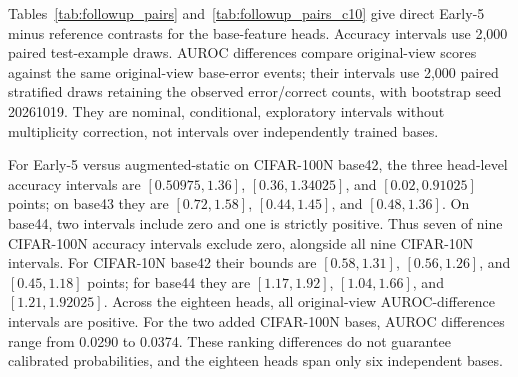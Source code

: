 \begin{table}[!ht]
\centering\small
\caption{Follow-up accuracy (\%); mean $\pm$ sample SD over three heads on each base. Each method retains its own noisy-validation-selected policy.}
\label{tab:followup_accuracy}

\end{table}

Tables~\ref{tab:followup_pairs} and~\ref{tab:followup_pairs_c10} give direct Early-5 minus reference contrasts for the base-feature heads. Accuracy intervals use 2,000 paired test-example draws. AUROC differences compare original-view scores against the same original-view base-error events; their intervals use 2,000 paired stratified draws retaining the observed error/correct counts, with bootstrap seed 20261019. They are nominal, conditional, exploratory intervals without multiplicity correction, not intervals over independently trained bases.

For Early-5 versus augmented-static on CIFAR-100N base42, the three head-level accuracy intervals are $[0.50975,1.36]$, $[0.36,1.34025]$, and $[0.02,0.91025]$ points; on base43 they are $[0.72,1.58]$, $[0.44,1.45]$, and $[0.48,1.36]$. On base44, two intervals include zero and one is strictly positive. Thus seven of nine CIFAR-100N accuracy intervals exclude zero, alongside all nine CIFAR-10N intervals. For CIFAR-10N base42 their bounds are $[0.58,1.31]$, $[0.56,1.26]$, and $[0.45,1.18]$ points; for base44 they are $[1.17,1.92]$, $[1.04,1.66]$, and $[1.21,1.92025]$. Across the eighteen heads, all original-view AUROC-difference intervals are positive. For the two added CIFAR-100N bases, AUROC differences range from 0.0290 to 0.0374. These ranking differences do not guarantee calibrated probabilities, and the eighteen heads span only six independent bases.

\begin{table}[!ht]
\centering\scriptsize
\caption{CIFAR-100N direct paired target contrasts. Gain and CI are accuracy percentage points; $\Delta$AUROC refers to original-view error ranking. $V_r/V_e$ lists reference/Early-5 selected views.}
\label{tab:followup_pairs}

\end{table}

\begin{table}[!ht]
\centering\scriptsize
\caption{CIFAR-10N Worse direct paired target contrasts; units and interval interpretation match Table~\ref{tab:followup_pairs}.}
\label{tab:followup_pairs_c10}

\end{table}

